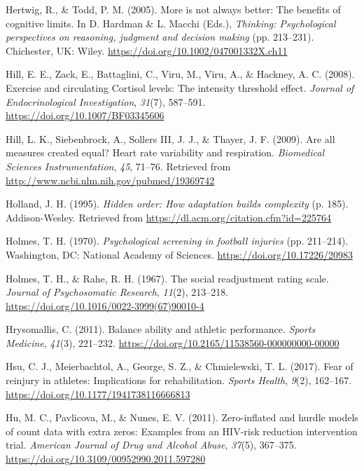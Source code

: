 \documentclass[
  english,
  man,floatsintext]{apa6}
\begin{document}
\leavevmode\hypertarget{ref-Hertwig2005}{}%
Hertwig, R., \& Todd, P. M. (2005). More is not always better: The benefits of cognitive limits. In D. Hardman \& L. Macchi (Eds.), \emph{Thinking: Psychological perspectives on reasoning, judgment and decision making} (pp. 213--231). Chichester, UK: Wiley. \url{https://doi.org/10.1002/047001332X.ch11}

\leavevmode\hypertarget{ref-Hill2008}{}%
Hill, E. E., Zack, E., Battaglini, C., Viru, M., Viru, A., \& Hackney, A. C. (2008). Exercise and circulating Cortisol levels: The intensity threshold effect. \emph{Journal of Endocrinological Investigation}, \emph{31}(7), 587--591. \url{https://doi.org/10.1007/BF03345606}

\leavevmode\hypertarget{ref-Hill2009}{}%
Hill, L. K., Siebenbrock, A., Sollers III, J. J., \& Thayer, J. F. (2009). Are all measures created equal? Heart rate variability and respiration. \emph{Biomedical Sciences Instrumentation}, \emph{45}, 71--76. Retrieved from \url{http://www.ncbi.nlm.nih.gov/pubmed/19369742}

\leavevmode\hypertarget{ref-Holland1995}{}%
Holland, J. H. (1995). \emph{Hidden order: How adaptation builds complexity} (p. 185). Addison-Wesley. Retrieved from \url{https://dl.acm.org/citation.cfm?id=225764}

\leavevmode\hypertarget{ref-Holmes1970}{}%
Holmes, T. H. (1970). \emph{Psychological screening in football injuries} (pp. 211--214). Washington, DC: National Academy of Sciences. \url{https://doi.org/10.17226/20983}

\leavevmode\hypertarget{ref-Holmes1967}{}%
Holmes, T. H., \& Rahe, R. H. (1967). The social readjustment rating scale. \emph{Journal of Psychosomatic Research}, \emph{11}(2), 213--218. \url{https://doi.org/10.1016/0022-3999(67)90010-4}

\leavevmode\hypertarget{ref-Hrysomallis2011}{}%
Hrysomallis, C. (2011). Balance ability and athletic performance. \emph{Sports Medicine}, \emph{41}(3), 221--232. \url{https://doi.org/10.2165/11538560-000000000-00000}

\leavevmode\hypertarget{ref-Hsu2017}{}%
Hsu, C. J., Meierbachtol, A., George, S. Z., \& Chmielewski, T. L. (2017). Fear of reinjury in athletes: Implications for rehabilitation. \emph{Sports Health}, \emph{9}(2), 162--167. \url{https://doi.org/10.1177/1941738116666813}

\leavevmode\hypertarget{ref-Hu2011}{}%
Hu, M. C., Pavlicova, M., \& Nunes, E. V. (2011). Zero-inflated and hurdle models of count data with extra zeros: Examples from an HIV-risk reduction intervention trial. \emph{American Journal of Drug and Alcohol Abuse}, \emph{37}(5), 367--375. \url{https://doi.org/10.3109/00952990.2011.597280}
\end{document}
